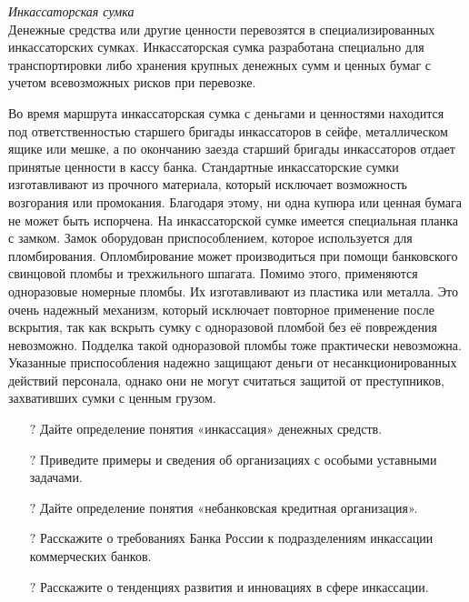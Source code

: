 \documentclass[a4paper,12pt,fleqn]{article} %
\begin{document}
\textit{Инкассаторская сумка}\\

Денежные средства или другие ценности перевозятся в специализированных инкассаторских сумках. Инкассаторская сумка разработана специально для транспортировки либо хранения крупных денежных сумм и ценных бумаг с учетом всевозможных рисков при перевозке. 

Во время маршрута инкассаторская сумка с деньгами и ценностями находится под ответственностью старшего бригады инкассаторов в сейфе, металлическом ящике или мешке, а по окончанию заезда старший бригады инкассаторов отдает принятые ценности в кассу банка. Стандартные инкассаторские сумки изготавливают из прочного материала, который исключает возможность возгорания или промокания. Благодаря этому, ни одна купюра или ценная бумага не может быть испорчена. 	На инкассаторской сумке имеется специальная планка с замком. Замок оборудован приспособлением, которое используется для пломбирования. Опломбирование может производиться при помощи банковского свинцовой пломбы и трехжильного шпагата. Помимо этого, применяются одноразовые номерные пломбы. Их изготавливают из пластика или металла. Это очень надежный механизм, который исключает повторное применение после вскрытия, так как вскрыть сумку с одноразовой пломбой без её повреждения невозможно. Подделка такой одноразовой пломбы тоже практически невозможна. Указанные приспособления надежно защищают деньги от несанкционированных действий персонала, однако они не могут считаться защитой от преступников, захвативших сумки с ценным грузом.\\

\begin{tcolorbox}[colback=blue!40!red!1!,colframe=blue!40!red,enforce breakable,%
	pad at break=1mm, title=Вопросы и задания для самоконтроля]
	\begin{itemize}
		\item[{\color{blue!55!red}\Huge { $ ? $}} ]  Дайте определение понятия «инкассация» денежных средств.
		\item[{\color{blue!55!red}\Huge {  $ ? $}} ] Приведите примеры и сведения об организациях с особыми уставными задачами.
		\item[{\color{blue!55!red}\Huge {  $ ? $}} ] Дайте определение понятия «небанковская кредитная организация».
		\item[{\color{blue!55!red}\Huge {  $ ? $}} ] Расскажите о требованиях Банка России к подразделениям инкассации коммерческих банков.
		\item[{\color{blue!55!red}\Huge {  $ ? $}} ] 
		Расскажите о тенденциях развития и инновациях в сфере инкассации.
	\end{itemize}		
\end{tcolorbox}
\end{document}
